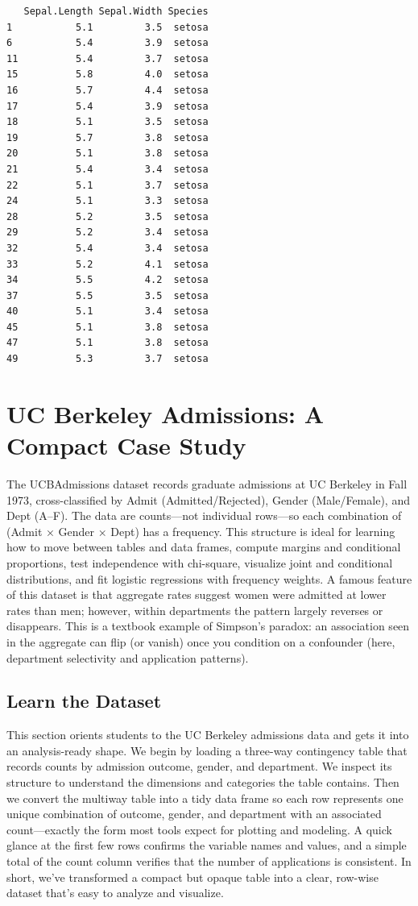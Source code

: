 \documentclass[
  letterpaper,
  DIV=11,
  numbers=noendperiod]{scrreprt}
\begin{document}
\begin{verbatim}
   Sepal.Length Sepal.Width Species
1           5.1         3.5  setosa
6           5.4         3.9  setosa
11          5.4         3.7  setosa
15          5.8         4.0  setosa
16          5.7         4.4  setosa
17          5.4         3.9  setosa
18          5.1         3.5  setosa
19          5.7         3.8  setosa
20          5.1         3.8  setosa
21          5.4         3.4  setosa
22          5.1         3.7  setosa
24          5.1         3.3  setosa
28          5.2         3.5  setosa
29          5.2         3.4  setosa
32          5.4         3.4  setosa
33          5.2         4.1  setosa
34          5.5         4.2  setosa
37          5.5         3.5  setosa
40          5.1         3.4  setosa
45          5.1         3.8  setosa
47          5.1         3.8  setosa
49          5.3         3.7  setosa
\end{verbatim}

\section{UC Berkeley Admissions: A Compact Case
Study}\label{uc-berkeley-admissions-a-compact-case-study}

The UCBAdmissions dataset records graduate admissions at UC Berkeley in
Fall 1973, cross-classified by Admit (Admitted/Rejected), Gender
(Male/Female), and Dept (A--F). The data are counts---not individual
rows---so each combination of (Admit × Gender × Dept) has a frequency.
This structure is ideal for learning how to move between tables and data
frames, compute margins and conditional proportions, test independence
with chi-square, visualize joint and conditional distributions, and fit
logistic regressions with frequency weights. A famous feature of this
dataset is that aggregate rates suggest women were admitted at lower
rates than men; however, within departments the pattern largely reverses
or disappears. This is a textbook example of Simpson's paradox: an
association seen in the aggregate can flip (or vanish) once you
condition on a confounder (here, department selectivity and application
patterns).

\subsection{Learn the Dataset}\label{learn-the-dataset}

This section orients students to the UC Berkeley admissions data and
gets it into an analysis-ready shape. We begin by loading a three-way
contingency table that records counts by admission outcome, gender, and
department. We inspect its structure to understand the dimensions and
categories the table contains. Then we convert the multiway table into a
tidy data frame so each row represents one unique combination of
outcome, gender, and department with an associated count---exactly the
form most tools expect for plotting and modeling. A quick glance at the
first few rows confirms the variable names and values, and a simple
total of the count column verifies that the number of applications is
consistent. In short, we've transformed a compact but opaque table into
a clear, row-wise dataset that's easy to analyze and visualize.
\end{document}
